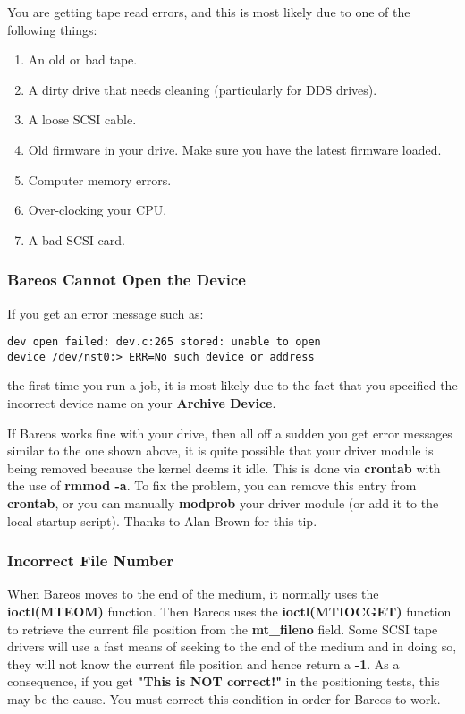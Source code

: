{You are getting tape read errors, and this is most likely due to
one of the following things:
\begin{enumerate}
\item An old or bad tape.
\item A dirty drive that needs cleaning (particularly for DDS drives).
\item A loose SCSI cable.
\item Old firmware in your drive. Make sure you have the latest firmware
      loaded.
\item Computer memory errors.
\item Over-clocking your CPU.
\item A bad SCSI card.
\end{enumerate}


\label{opendevice}
\subsubsection{Bareos Cannot Open the Device}

If you get an error message such as:

\footnotesize
\begin{verbatim}
dev open failed: dev.c:265 stored: unable to open
device /dev/nst0:> ERR=No such device or address
\end{verbatim}
\normalsize

the first time you run a job, it is most likely due to the fact that you
specified the incorrect device name on your {\bf Archive Device}.

If Bareos works fine with your drive, then all off a sudden you get error
messages similar to the one shown above, it is quite possible that your driver
module is being removed because the kernel deems it idle. This is done via
{\bf crontab} with the use of {\bf rmmod -a}. To fix the problem, you can
remove this entry from {\bf crontab}, or you can manually {\bf modprob} your
driver module (or add it to the local startup script). Thanks to Alan Brown
for this tip.
\label{IncorrectFiles}

\subsubsection{Incorrect File Number}

When Bareos moves to the end of the medium, it normally uses the {\bf
ioctl(MTEOM)} function. Then Bareos uses the {\bf ioctl(MTIOCGET)} function to
retrieve the current file position from the {\bf mt\_fileno} field. Some SCSI
tape drivers will use a fast means of seeking to the end of the medium and in
doing so, they will not know the current file position and hence return a {\bf
-1}. As a consequence, if you get {\bf "This is NOT correct!"} in the
positioning tests, this may be the cause. You must correct this condition in
order for Bareos to work.

}
